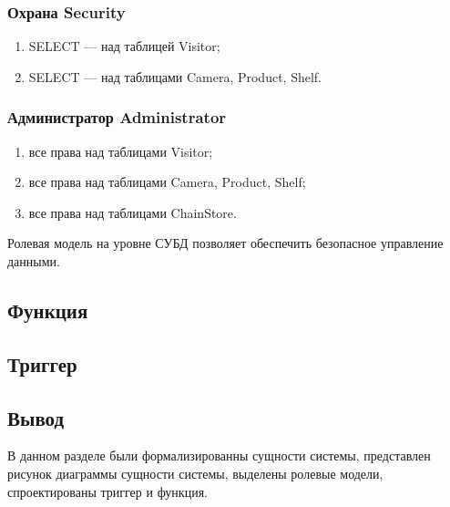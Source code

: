 \subsubsection{Охрана Security}

\begin{enumerate}[label=\arabic*.]
    \item SELECT --- над таблицей Visitor;
    \item SELECT --- над таблицами Camera, Product, Shelf.
\end{enumerate}


\subsubsection{Администратор Administrator}

\begin{enumerate}[label=\arabic*.]
    \item все права над таблицами Visitor;
    \item все права над таблицами Camera, Product, Shelf;
    \item все права над таблицами ChainStore.
\end{enumerate}

Ролевая модель на уровне СУБД позволяет обеспечить безопасное управление данными.

\subsection{Функция}


\subsection{Триггер}


\subsection*{Вывод}

В данном разделе были формализированны сущности системы, представлен рисунок диаграммы сущности системы,
выделены ролевые модели, спроектированы триггер и функция.